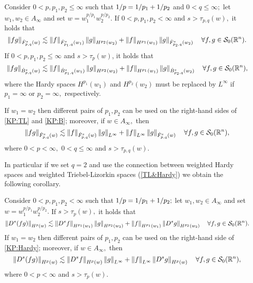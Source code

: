 {\begin{corollary}\label{coro:KP:TL:B}  Consider  $0 < p, p_1, p_2  \le \infty$  such that $\hcline$ and  $0 < q \leq \infty;$ let  $w_1,w_2\in A_\infty$ and set $w=w_1^{{p}/{p_1}} w_2^{{p}/{p_2}}.$ 
If $0 < p ,p_1,p_2< \infty$ and  $s > \tau_{p,q}(w),$ it holds that
\begin{equation}\label{KP:TL}
\norm{fg}{\tlw{p}{s}{q}{w}} \lesssim \norm{f}{\tlw{p_1}{s}{q}{w_1}} \norm{g}{H^{p_2}(w_2)} +  \norm{f}{H^{p_1}(w_1)}   \norm{g}{\tlw{p_2}{s}{q}{w_2}} \quad \forall f, g \in \swz.
\end{equation}
If $0 < p, p_1,p_2 \le \infty$ and $s > \tau_p(w)$, it holds that
\begin{equation}\label{KP:B}
\norm{fg}{\besw{p}{s}{q}{w}} \lesssim \norm{f}{\besw{p_1}{s}{q}{w_1}} \norm{g}{H^{p_2}(w_2)} +  \norm{f}{H^{p_1}(w_1)}   \norm{g}{\besw{p_2}{s}{q}{w_2}} \quad \forall f, g \in \swz,
\end{equation}
where the Hardy spaces $H^{p_1}(w_1)$ and $H^{p_2}(w_2)$ must be replaced by $L^\infty$ if $p_1=\infty$ or $p_2=\infty,$ respectively.

If $w_1=w_2$ then different pairs of $p_1, p_2$ can be used on the right-hand sides of \eqref{KP:TL} and \eqref{KP:B}; moreover, if $w\in A_\infty,$ then 
\begin{equation}\label{KP:TL2}
\norm{fg}{\tlw{p}{s}{q}{w}} \lesssim \norm{f}{\tlw{p}{s}{q}{w}} \norm{g}{L^\infty} +  \norm{f}{L^\infty}   \norm{g}{\tlw{p}{s}{q}{w}} \quad \forall f, g \in \swz,
\end{equation}
where $0<p<\infty,$ $0<q\le \infty$ and $s>\tau_{p,q}(w).$
\end{corollary}


In particular if we set $q=2$ and use the connection between weighted Hardy spaces and weighted Triebel-Lizorkin spaces (\ref{TL&Hardy}) we obtain the following corollary. 

\begin{corollary}\label{coro:KP:Hardy} 
Consider  $0 < p, p_1, p_2  < \infty$  such that $\hcline;$ let  $w_1,w_2\in A_\infty$ and set $w=w_1^{{p}/{p_1}} w_2^{{p}/{p_2}}.$ 
If  $s > \tau_{p}(w),$ it holds that
\begin{equation}\label{KP:Hardy}
\norm{D^s(fg)}{H^p(w)} \lesssim \norm{D^s f}{H^{p_1}(w_1)} \norm{g}{H^{p_2}(w_2)} +  \norm{f}{H^{p_1}(w_1)}   \norm{D^s g}{H^{p_2}(w_2)} \quad \forall f, g \in \swz.
\end{equation}
If $w_1=w_2$ then different pairs of $p_1, p_2$ can be used on the right-hand side of \eqref{KP:Hardy}; moreover, if $w\in A_\infty,$ then 
\begin{equation*}
\norm{D^s(fg)}{H^p(w)} \lesssim \norm{D^s f}{H^{p}(w)} \norm{g}{L^\infty} +  \norm{f}{L^\infty}   \norm{D^s g}{H^{p}(w)} \quad \forall f, g \in \swz,
\end{equation*}
where $0<p<\infty$ and $s>\tau_{p}(w).$
\end{corollary}
 
}
